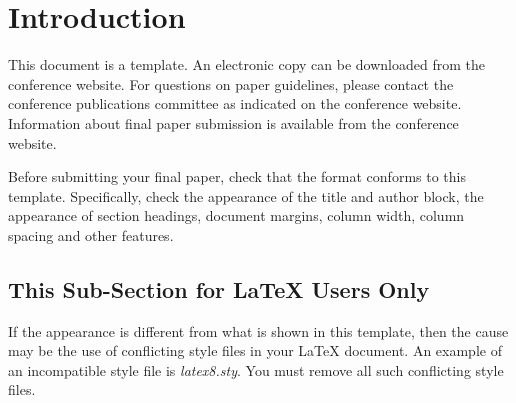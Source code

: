 \section{Introduction}
%
This document is a template.  An electronic copy can be downloaded
from the conference website.  For questions on paper guidelines,
please contact the conference publications committee as indicated on
the conference website.  Information about final paper submission is
available from the conference website.

Before submitting your final paper, check that the format conforms to
this template.  Specifically, check the appearance of the title and
author block, the appearance of section headings, document margins,
column width, column spacing and other features.

\subsection{This Sub-Section for LaTeX Users Only}

If the appearance is different from what is shown in this template,
then the cause may be the use of conflicting style files in your
LaTeX document.  An example of an incompatible style file is {\it
latex8.sty}.  You must remove all such conflicting style files.
